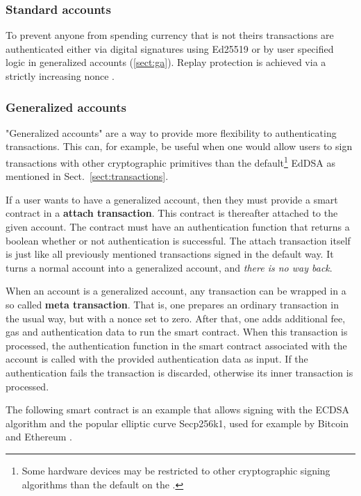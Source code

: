 \subsubsection{Standard accounts}
To prevent anyone from spending currency that is not theirs transactions are
authenticated either via digital signatures using
Ed25519 \cite{bernstein2012high, bernstein2006curve25519} or by user specified
logic in generalized accounts (\ref{sect:ga}).
Replay protection is achieved via a strictly increasing nonce \cite{Syverson}.
\subsubsection{Generalized accounts}

"Generalized accounts" are a way to provide more flexibility to authenticating
transactions. This can, for example, be useful when one would allow users to
sign transactions with other cryptographic primitives than the
default\footnote{Some hardware devices may be restricted to other cryptographic
signing algorithms than the default on the \blockchain.} EdDSA as mentioned in
Sect.\ \ref{sect:transactions}.

If a user wants to have a generalized account, then they must
provide a smart contract in a \textbf{attach transaction}. This
contract is thereafter attached to the given account. The contract
must have an authentication function that returns a boolean whether or
not authentication is successful. The attach transaction itself is
just like all previously mentioned transactions signed in the default
way. It turns a normal account into a generalized account, and
\textit{there is no way back}.

When an account is a generalized account, any transaction can
be wrapped in a so called \textbf{meta transaction}. That is, one
prepares an ordinary transaction in the usual way, but with a nonce set to
zero. After that, one adds additional fee, gas and authentication data to
run the smart contract. When this transaction is processed, the
authentication function in the smart contract associated with the
account is called with the provided authentication data as input. If
the authentication fails the transaction is discarded, otherwise its
inner transaction is processed.

The following smart contract is an example that allows signing with
the ECDSA algorithm \cite{johnson2001elliptic} and the popular elliptic curve
Secp256k1, used for example by Bitcoin and Ethereum
\cite{bos2014elliptic, mayer2016ecdsa}.

